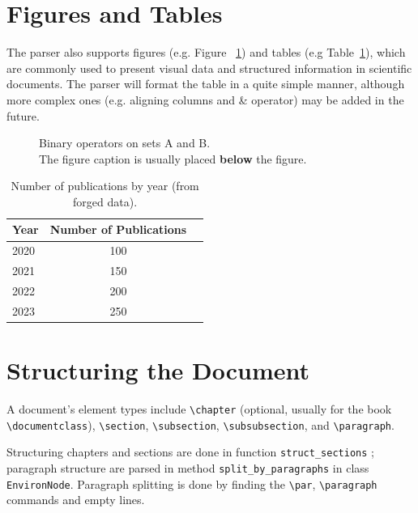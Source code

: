 \documentclass{article}
\newcommand{\texcmd}[1]{\texttt{\textbackslash#1}}
\begin{document}
\section{Figures and Tables}
 \label{sec:figtab} \par The parser also supports figures (e.g. Figure~
\ref{fig:venn}) and tables (e.g Table~\ref{tab:pub}), which are commonly used
to present visual data and structured information in scientific documents. The
parser will format the table in a quite simple manner, although more complex
ones (e.g. aligning columns and \& operator) may be added in the future.
\begin{figure}[ht]
  \centering {} \caption{Binary operators on sets {A} and {B}. \\
  {\small The figure caption is usually placed \textbf{below} the figure.}
  } \label{fig:venn}
\end{figure}
\begin{table}[ht]
  \centering \caption{Number of publications by year (from forged data).}
  \label{tab:pub} \begin{tabular}{lcc}
  \hline
  Year & Number of Publications \\
  \hline
  2020 & 100 \\
  2021 & 150 \\
  2022 & 200 \\
  2023 & 250 \\
  \hline
  \end{tabular}
\end{table}

\section{Structuring the Document}
 \label{sec:struct} \par A document's element types include \texcmd{chapter}
(optional, usually for the book \texcmd{documentclass}), \texcmd{section},
\texcmd{subsection}, \texcmd{subsubsection}, and \texcmd{paragraph}. \par
Structuring chapters and sections are done in function
\texttt{struct\_sections} ; paragraph structure are parsed in method
\texttt{split\_by\_paragraphs} in class \texttt{EnvironNode}. Paragraph
splitting is done by finding the \texcmd{par}, \texcmd{paragraph} commands and
empty lines.
\end{document}
